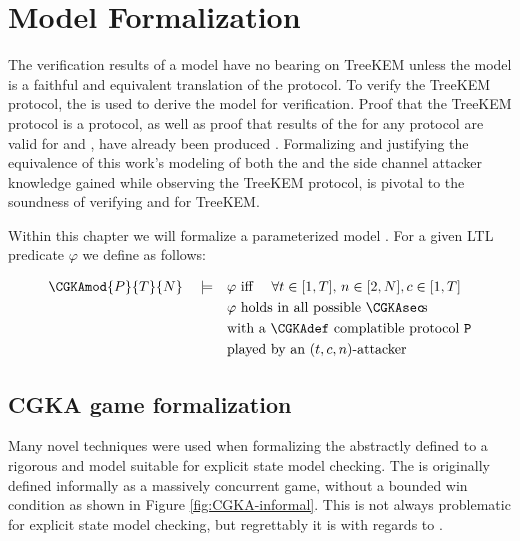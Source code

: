 \hypertarget{sec:model-formalization}{%
\chapter{Model Formalization}\label{sec:model-formalization}}

The verification results of a model have no bearing on TreeKEM unless the model is a faithful and equivalent translation of the protocol.
To verify the TreeKEM protocol, the \CGKAdef is used to derive the model for verification.
Proof that the TreeKEM protocol is a  protocol, as well as proof that results of the \CGKAdef for any  protocol are valid for  and , have already been produced \autocite{alwen2020security}.
Formalizing and justifying the equivalence of this work's modeling of both the \CGKAdef and the side channel attacker knowledge gained while observing the TreeKEM protocol, is pivotal to the soundness of verifying  and  for TreeKEM.

Within this chapter we will formalize a parameterized model .
For a given LTL predicate $\varphi$ we define  as follows:

\[
\begin{split}
\CGKAmod{P}{T}{N}\quad\models\quad& \varphi \textrm{ iff }\quad\forall t \in [1, T],\, n \in [2, N], c \in [1, T]\\
  & \varphi \textrm{ holds in all possible \CGKAsec\!s}\\
  & \textrm{with a \CGKAdef complatible protocol } \mathtt{P}\\
  & \textrm{played by an } (t, c, n)\textrm{-attacker}
\end{split}
\]


\hypertarget{sec:game-adaptations}{%
\section{CGKA game formalization}\label{sec:game-adaptations}}

Many novel techniques were used when formalizing the abstractly defined \CGKAdef to a rigorous and model suitable for explicit state model checking.
The \CGKAdef is originally defined informally as a massively concurrent game, without a bounded win condition as shown in Figure \ref{fig:CGKA-informal}.
This is not always problematic for explicit state model checking, but regrettably it is with regards to \CGKAdef.

